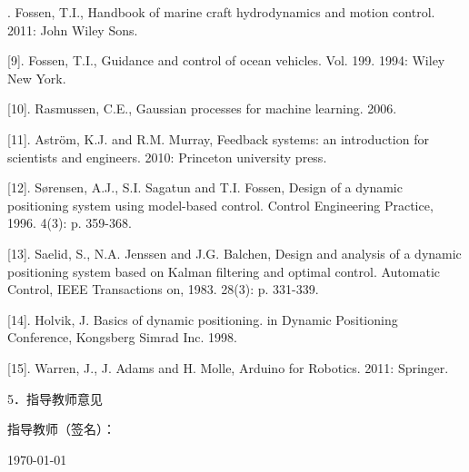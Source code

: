 \documentclass[a4paper]{ctexart}
\begin{document}
 \begin{mdframed}
 {\large \fangsong
 [8].	Fossen, T.I., Handbook of marine craft hydrodynamics and motion control. 2011: John Wiley  Sons.
 
 [9].	Fossen, T.I., Guidance and control of ocean vehicles. Vol. 199. 1994: Wiley New York.
 
[10].	Rasmussen, C.E., Gaussian processes for machine learning. 2006.

[11].	Aström, K.J. and R.M. Murray, Feedback systems: an introduction for scientists and engineers. 2010: Princeton university press.

[12].	Sørensen, A.J., S.I. Sagatun and T.I. Fossen, Design of a dynamic positioning system using model-based control. Control Engineering Practice, 1996. 4(3): p. 359-368.

[13].	Saelid, S., N.A. Jenssen and J.G. Balchen, Design and analysis of a dynamic positioning system based on Kalman filtering and optimal control. Automatic Control, IEEE Transactions on, 1983. 28(3): p. 331-339.

[14].	Holvik, J. Basics of dynamic positioning. in Dynamic Positioning Conference, Kongsberg Simrad Inc. 1998.

[15].	Warren, J., J. Adams and H. Molle, Arduino for Robotics. 2011: Springer.

\begin{flushleft}
5．指导教师意见

\end{flushleft}
\vskip7.8cm
\begin{flushright}
指导教师（签名）：\quad \quad \quad 

\today
\end{flushright}                  
}
\end{mdframed}

\end{document}
